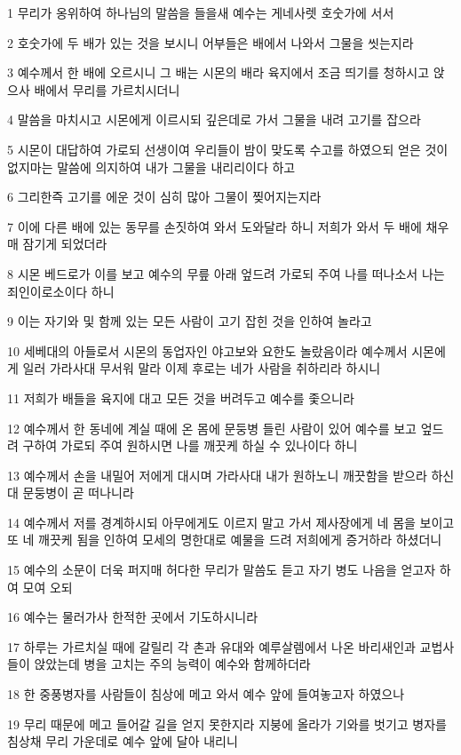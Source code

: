 \par 1 무리가 옹위하여 하나님의 말씀을 들을새 예수는 게네사렛 호숫가에 서서
\par 2 호숫가에 두 배가 있는 것을 보시니 어부들은 배에서 나와서 그물을 씻는지라
\par 3 예수께서 한 배에 오르시니 그 배는 시몬의 배라 육지에서 조금 띄기를 청하시고 앉으사 배에서 무리를 가르치시더니
\par 4 말씀을 마치시고 시몬에게 이르시되 깊은데로 가서 그물을 내려 고기를 잡으라
\par 5 시몬이 대답하여 가로되 선생이여 우리들이 밤이 맞도록 수고를 하였으되 얻은 것이 없지마는 말씀에 의지하여 내가 그물을 내리리이다 하고
\par 6 그리한즉 고기를 에운 것이 심히 많아 그물이 찢어지는지라
\par 7 이에 다른 배에 있는 동무를 손짓하여 와서 도와달라 하니 저희가 와서 두 배에 채우매 잠기게 되었더라
\par 8 시몬 베드로가 이를 보고 예수의 무릎 아래 엎드려 가로되 주여 나를 떠나소서 나는 죄인이로소이다 하니
\par 9 이는 자기와 및 함께 있는 모든 사람이 고기 잡힌 것을 인하여 놀라고
\par 10 세베대의 아들로서 시몬의 동업자인 야고보와 요한도 놀랐음이라 예수께서 시몬에게 일러 가라사대 무서워 말라 이제 후로는 네가 사람을 취하리라 하시니
\par 11 저희가 배들을 육지에 대고 모든 것을 버려두고 예수를 좇으니라
\par 12 예수께서 한 동네에 계실 때에 온 몸에 문둥병 들린 사람이 있어 예수를 보고 엎드려 구하여 가로되 주여 원하시면 나를 깨끗케 하실 수 있나이다 하니
\par 13 예수께서 손을 내밀어 저에게 대시며 가라사대 내가 원하노니 깨끗함을 받으라 하신대 문둥병이 곧 떠나니라
\par 14 예수께서 저를 경계하시되 아무에게도 이르지 말고 가서 제사장에게 네 몸을 보이고 또 네 깨끗케 됨을 인하여 모세의 명한대로 예물을 드려 저희에게 증거하라 하셨더니
\par 15 예수의 소문이 더욱 퍼지매 허다한 무리가 말씀도 듣고 자기 병도 나음을 얻고자 하여 모여 오되
\par 16 예수는 물러가사 한적한 곳에서 기도하시니라
\par 17 하루는 가르치실 때에 갈릴리 각 촌과 유대와 예루살렘에서 나온 바리새인과 교법사들이 앉았는데 병을 고치는 주의 능력이 예수와 함께하더라
\par 18 한 중풍병자를 사람들이 침상에 메고 와서 예수 앞에 들여놓고자 하였으나
\par 19 무리 때문에 메고 들어갈 길을 얻지 못한지라 지붕에 올라가 기와를 벗기고 병자를 침상채 무리 가운데로 예수 앞에 달아 내리니
